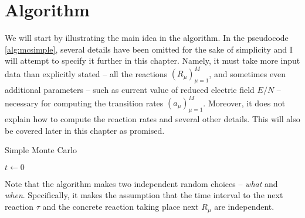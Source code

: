 
\section{Algorithm}

We will start by illustrating the main idea in the algorithm. In the pseudocode \ref{alg:mcsimple}, several details have been omitted for the sake of simplicity and I will attempt to specify it further in this chapter. Namely, it must take more input data than explicitly stated -- all the reactions $(R_\mu)_{\mu=1}^M$, and sometimes even additional parameters -- such as current value of reduced electric field $E/N$ -- necessary for computing the transition rates $(a_\mu)_{\mu=1}^M$. Moreover, it does not explain how to compute the reaction rates and several other details. This will also be covered later in this chapter as promised.

\begin{algorithm}
\caption{Simple Monte Carlo}\label{alg:mcsimple}

$t \gets 0$\\
\end{algorithm}

Note that the algorithm makes two independent random choices -- \textit{what} and \textit{when}. Specifically, it makes the assumption that the time interval to the next reaction $\tau$ and the concrete reaction taking place next $R_\mu$ are independent.

